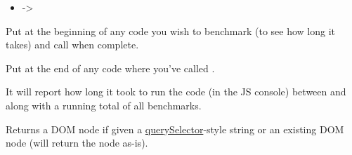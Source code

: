 \documentclass[letterpaper,10pt,openany]{sphinxmanual}
\begin{document}
\begin{fulllineitems}
\begin{fulllineitems}
\begin{fulllineitems}
\begin{itemize}
\item {} 
 -\textgreater{} {\hyperref[Developer/js_gateone:GateOne.Utils.enumerateThemes]{}}

\end{itemize}

\end{fulllineitems}



\begin{fulllineitems}
\label{Developer/js_gateone:GateOne.Utils.startBenchmark}
Put {\hyperref[Developer/js_gateone:GateOne.Utils.startBenchmark]{}} at the beginning of any code you wish to benchmark (to see how long it takes) and call {\hyperref[Developer/js_gateone:GateOne.Utils.stopBenchmark]{}} when complete.

\end{fulllineitems}



\begin{fulllineitems}
\label{Developer/js_gateone:GateOne.Utils.stopBenchmark}
Put  at the end of any code where you've called {\hyperref[Developer/js_gateone:GateOne.Utils.startBenchmark]{}}.

It will report how long it took to run the code (in the JS console) between {\hyperref[Developer/js_gateone:GateOne.Utils.startBenchmark]{}} and {\hyperref[Developer/js_gateone:GateOne.Utils.stopBenchmark]{}} along with a running total of all benchmarks.

\end{fulllineitems}



\begin{fulllineitems}
\label{Developer/js_gateone:GateOne.Utils.getNode}
Returns a DOM node if given a \href{https://developer.mozilla.org/en-US/docs/DOM/Document.querySelector}{querySelector}-style string or an existing DOM node (will return the node as-is).


\end{fulllineitems}
\end{fulllineitems}
\end{fulllineitems}
\end{document}
